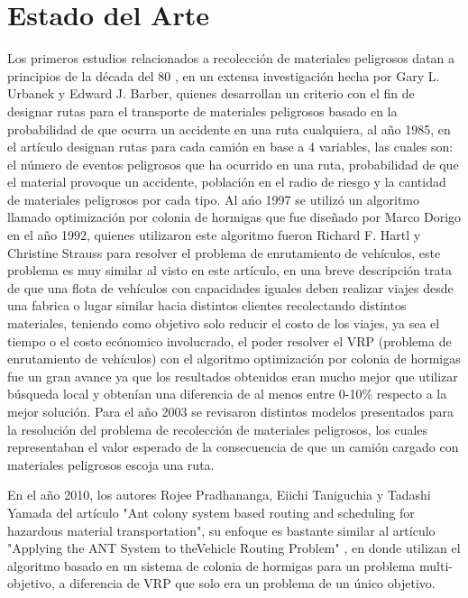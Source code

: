 \documentclass[conference]{IEEEtran}
\begin{document}
\section{Estado del Arte}
Los primeros estudios relacionados a recolecci\'on de materiales peligrosos datan a principios de la d\'ecada del 80 \cite{b4}, en un extensa investigaci\'on hecha por Gary L. Urbanek y Edward J. Barber, quienes desarrollan un criterio con el fin de designar rutas para el transporte de materiales peligrosos basado en la probabilidad de que ocurra un accidente en una ruta cualquiera, al a\~no 1985, en el art\'iculo \cite{b3} designan rutas para cada cami\'on en base a 4 variables, las cuales son: el n\'umero de eventos peligrosos que ha ocurrido en una ruta, probabilidad de que el material provoque un accidente, poblaci\'on en el radio de riesgo y la cantidad de materiales peligrosos por cada tipo. Al a\'no 1997 \cite{b5} se utiliz\'o un algoritmo llamado optimizaci\'on por colonia de hormigas que fue dise\~nado por Marco Dorigo en el a\~no 1992, quienes utilizaron este algoritmo fueron Richard F. Hartl y Christine Strauss para resolver el problema de enrutamiento de veh\'iculos, este problema es muy similar al visto en este art\'iculo, en una breve descripci\'on trata de que una flota de veh\'iculos con capacidades iguales deben realizar viajes desde una fabrica o lugar similar hacia distintos clientes recolectando distintos materiales, teniendo como objetivo solo reducir el costo de los viajes, ya sea el tiempo o el costo ec\'onomico involucrado, el poder resolver el VRP (problema de enrutamiento de veh\'iculos) con el algoritmo optimizaci\'on por colonia de hormigas fue un gran avance ya que los resultados obtenidos eran mucho mejor que utilizar b\'usqueda local y obten\'ian una diferencia de al menos entre 0-10\% respecto a la mejor soluci\'on. Para el a\~no 2003 \cite{b6} se revisaron distintos modelos presentados para la resoluci\'on del problema de recolecci\'on de materiales peligrosos, los cuales representaban el valor esperado de la consecuencia de que un cami\'on cargado con materiales peligrosos escoja una ruta.

En el a\~no 2010, los autores Rojee  Pradhananga,  Eiichi  Taniguchia y Tadashi  Yamada del art\'iculo \cite{b1} "Ant colony system based routing and scheduling for hazardous material transportation", su enfoque es bastante similar al art\'iculo "Applying  the  ANT  System  to  theVehicle Routing Problem" \cite{b5}, en donde utilizan el algoritmo basado en un sistema de colonia de hormigas para un problema multi-objetivo, a diferencia de VRP que solo era un problema de un \'unico objetivo. 
\end{document}
